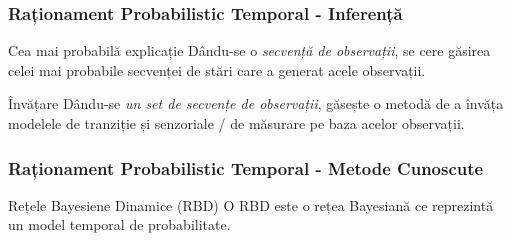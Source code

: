 \begin{frame}
  \frametitle{Raționament Probabilistic Temporal - Inferență}
	\begin{block}{Cea mai probabilă explicație}
		Dându-se o \emph{secvență de observații}, se cere găsirea \alert{celei mai probabile secvenței de stări}
		care a generat acele observații.
	\end{block}
	\pause
	
	\begin{block}{Învățare}
		Dându-se \emph{un set de secvențe de observații}, găsește o metodă de a învăța \alert{modelele} de
		\alert{tranziție} și \alert{senzoriale / de măsurare} pe baza acelor observații.
	\end{block}
\end{frame}

\begin{frame}[t]
    \frametitle{Raționament Probabilistic Temporal - Metode Cunoscute}
    
  	\begin{block}{Rețele Bayesiene Dinamice (RBD)}
  		O RBD este o rețea Bayesiană ce reprezintă un model temporal de probabilitate.
  	\end{block}
  	

\end{frame}
